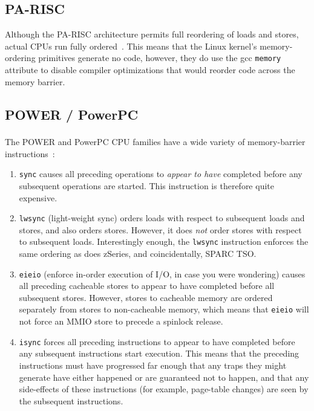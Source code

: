\subsection{PA-RISC}

Although the PA-RISC architecture permits full reordering of loads and
stores, actual CPUs run fully ordered~\cite{GerryKane96a}.
This means that the Linux kernel's memory-ordering primitives generate
no code, however, they do use the gcc {\tt memory} attribute to disable
compiler optimizations that would reorder code across the memory
barrier.

\subsection{POWER / PowerPC}
\label{sec:app:whymb:POWER / PowerPC}

The POWER and PowerPC\textsuperscript{\textregistered}
CPU families have a wide variety of memory-barrier
instructions~\cite{PowerPC94,MichaelLyons02a}:
\begin{enumerate}
\item	{\tt sync} causes all preceding operations to {\em appear to have}
	completed before any subsequent operations are started.
	This instruction is therefore quite expensive.
\item	{\tt lwsync} (light-weight sync) orders loads with respect to
	subsequent loads and stores, and also orders stores.
	However, it does {\em not} order stores with respect to subsequent
	loads.
	Interestingly enough, the {\tt lwsync} instruction enforces
	the same ordering as does zSeries, and coincidentally,
	SPARC TSO.
\item	{\tt eieio} (enforce in-order execution of I/O, in case you
	were wondering) causes all preceding cacheable stores to appear
	to have completed before all subsequent stores.
	However, stores to cacheable memory are ordered separately from
	stores to non-cacheable memory, which means that {\tt eieio}
	will not force an MMIO store to precede a spinlock release.
\item	{\tt isync} forces all preceding instructions to appear to have
	completed before any subsequent instructions start execution.
	This means that the preceding instructions must have progressed
	far enough that any traps they might generate have either happened
	or are guaranteed not to happen, and that any side-effects of
	these instructions (for example, page-table changes) are seen by the
	subsequent instructions.
\end{enumerate}

